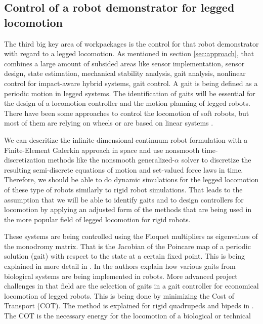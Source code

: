 \subsection*{Control of a robot demonstrator for legged locomotion} \label{sub:Control}
%
The third big key area of workpackages is the control for that robot demonstrator with regard to a legged locomotion. As mentioned in section \ref{sec:approach}, that combines a large amount of subsided
areas like sensor implementation, sensor design, state estimation, mechanical stability analysis, gait analysis, nonlinear control for impact-aware hybrid systems, gait control.
A gait is being defined as a periodic motion in legged systems. The identification of gaits will be essential for the design of a locomotion controller and the motion planning 
of legged robots. There have been some approaches to control the locomotion of soft robots, but most of them are relying on wheels \cite{Walker2011_conf}
or are based on linear systems \cite{Huang2020}. \par
%
We can descritize the infinite-dimensional continuum robot formulation with a Finite-Element Galerkin approach in space and use nonsmooth time-\-discreti\-zation methods like
 the nonsmooth generalized-$\alpha$ solver\cite{Capobianco2021} to discretize the resulting semi-discrete equations of motion and set-valued force laws in time.
Therefore, we should be able to do dynamic simulations for the legged locomotion of these type of robots similarly to rigid robot simulations. That leads to the assumption that
 we will be able to identify gaits and to design controllers for locomotion by applying an adjusted form of the methods that are being used in the more popular field of legged
  locomotion for rigid robots.
\par
  These systems are being controlled using the Floquet multipliers as eigenvalues of the monodromy matrix. That is the Jacobian of the Poincare map of a periodic solution (gait) with
   respect to the state at a certain fixed point. This is being explained in more detail in \cite{Grizzle2014,Raff2022,Remy2011_conf}.
 In \cite{Yesilevskiy2018} the authors explain how various gaits from biological systems are being implemented in robots. 
  More advanced project challenges in that field are the selection of gaits in a gait controller for economical locomotion of legged robots. This is being done by minimizing
   the Cost of Transport (COT). The method is explained for rigid quadrupeds and bipeds in \cite{Xi2016}. The COT is the necessary energy for the locomotion of a biological or technical
